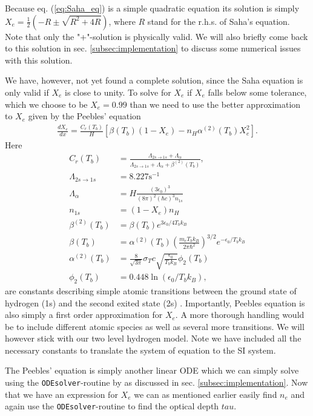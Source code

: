\documentclass[twocolumn]{aastex62}
\begin{document}
Because eq. (\ref{eq:Saha_eq}) is a simple quadratic equation its solution is simply 
$X_e = \frac{1}{2} (-R \pm \sqrt{R^2 + 4R})$, where $R$ stand for the r.h.s. of Saha's equation. Note that only the "+"-solution is physically valid. We will also briefly come back to this solution in sec. \ref{subsec:implementation} to discuss some numerical issues with this solution.

We have, however, not yet found a complete solution, since the Saha equation is only valid if $X_e$ is close to unity. To solve for $X_e$ if $X_e$ falls below some tolerance, which we choose to be $X_e = 0.99$ than we need to use the better approximation to $X_e$ given by the Peebles' equation
\begin{align}
    \frac{dX_e}{dx} = \frac{C_r(T_b)}{H} \left[\beta(T_b)(1-X_e) - n_H
              \alpha^{(2)}(T_b)X_e^2\right].
    \label{eq:peebles}
\end{align}
Here 
\begin{align}
    C_r(T_b) &= \frac{\Lambda_{2s\rightarrow1s} +
              \Lambda_{\alpha}}{\Lambda_{2s\rightarrow1s} + \Lambda_{\alpha} +
              \beta^{(2)}(T_b)}, \\
    \Lambda_{2s\rightarrow1s} &= 8.227 \textrm{s}^{-1}\\
    \Lambda_{\alpha} &= H\frac{(3\epsilon_0)^3}{(8\pi)^2 (\hbar c)^3 n_{1s}}\\
    n_{1s} &= (1-X_e)n_H \\
    \beta^{(2)}(T_b) &= \beta(T_b) e^{3\epsilon_0/4T_bk_B} \\
    \beta(T_b) &= \alpha^{(2)}(T_b) \left(\frac{m_e
              T_bk_B}{2\pi \hbar^2}\right)^{3/2} e^{-\epsilon_0/T_bk_B} \\
    \alpha^{(2)}(T_b) &= \frac{8}{\sqrt{3\pi}}
              \sigma_T c\sqrt{\frac{\epsilon_0}{T_bk_B}}\phi_2(T_b) \\
    \phi_2(T_b) &= 0.448\ln(\epsilon_0/T_bk_B),
\end{align}
are constants describing simple atomic transitions between the ground state of hydrogen (1s) and the second exited state (2s) \citep[]{winther:2020}. Importantly, Peebles equation is also simply a first order approximation for $X_e$. A more thorough handling would be to include different atomic species as well as several more transitions. We will however stick with our two level hydrogen model. Note we have included all the necessary constants to translate the system of equation to the SI system. 

The Peebles' equation is simply another linear ODE which we can simply solve using the \texttt{ODEsolver}-routine by \cite{winther:2020} as discussed in sec. \ref{subsec:implementation}. Now that we have an expression for $X_e$ we can as mentioned earlier easily find $n_e$ and again use the \texttt{ODEsolver}-routine to find the optical depth $tau$.
\end{document}
